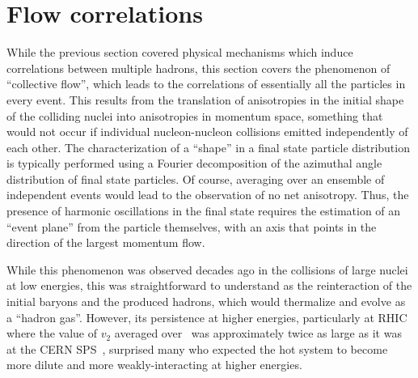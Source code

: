 \section{Flow correlations}
\label{sec:ps:flow}


While the previous section covered physical mechanisms which induce
correlations between multiple hadrons, this section covers the
phenomenon of ``collective flow'', which leads to the correlations of
essentially all the particles in every event.
This results from the translation of anisotropies in the initial shape of the
colliding nuclei into anisotropies in momentum space, something that
would not occur if individual nucleon-nucleon collisions emitted independently
of each other.
The characterization of a ``shape'' in a final state particle distribution
is typically performed using a Fourier decomposition of the azimuthal
angle distribution of final state particles.
Of course, averaging over an ensemble of independent events would lead to
the observation of no net anisotropy.  Thus, the presence of harmonic
oscillations in the final state requires the estimation of an ``event plane''
from the particle themselves, with an axis that points in the direction of
the largest momentum flow.

While this phenomenon was observed decades ago in the collisions of large
nuclei at low energies, this was straightforward to understand as the
reinteraction of the initial baryons and the produced hadrons, which
would thermalize and evolve as a ``hadron gas''.
However, its persistence at higher energies, particularly at RHIC where the
value of $v_2$ averaged over \pT\ was approximately twice as large as it was at the
CERN SPS~\cite{Ackermann:2000tr}, surprised many who expected the hot system to become more
dilute and more weakly-interacting at higher energies.

